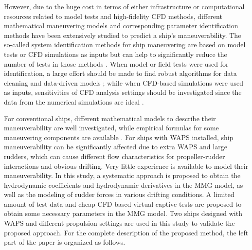 However, due to the huge cost in terms of either infrastructure or computational resources related to model tests and high-fidelity CFD methods, different mathematical maneuvering models and corresponding parameter identification methods have been extensively studied to predict a ship’s maneuverability. The so-called system identification methods for ship maneuvering are based on model tests or CFD simulations as inputs but can help to significantly reduce the number of tests in those methods \citep{lokukalugep.pereraSystemIdentificationVessel2016,alexanderssonSystemIdentificationPhysicsinformed2024b}. When model or field tests were used for identification, a large effort should be made to find robust algorithms for data cleaning and data-driven models \citep{revestidoherreroTwostepIdentificationNonlinear2012,alexanderssonSystemIdentificationVessel2022,duShipManeuveringPrediction2022}; while when CFD-based simulations were used as inputs, sensitivities of CFD analysis settings should be investigated since the data from the numerical simulations are ideal \citep{liuPredictionsShipManeuverability2018}.

For conventional ships, different mathematical models to describe their maneuverability are well investigated, while empirical formulas for some maneuvering components are available \citep{yasukawaIntroductionMMGStandard2015}. For ships with WAPS installed, ship maneuverability can be significantly affected due to extra WAPS and large rudders, which can cause different flow characteristics for propeller-rudder interactions and obvious drifting. Very little experience is available to model their maneuverability. In this study, a systematic approach is proposed to obtain the hydrodynamic coefficients and hydrodynamic derivatives in the MMG model, as well as the modeling of rudder forces in various drifting conditions. A limited amount of test data and cheap CFD-based virtual captive tests are proposed to obtain some necessary parameters in the MMG model. Two ships designed with WAPS and different propulsion settings are used in this study to validate the proposed approach. For the complete description of the proposed method, the left part of the paper is organized as follows. 

